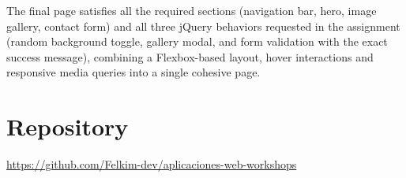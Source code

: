 \documentclass[12pt, a4paper]{article}
\begin{document}
The final page satisfies all the required sections (navigation bar, hero, image
gallery, contact form) and all three jQuery behaviors requested in the assignment
(random background toggle, gallery modal, and form validation with the exact
success message), combining a Flexbox-based layout, hover interactions and
responsive media queries into a single cohesive page.

\section{Repository}

\url{https://github.com/Felkim-dev/aplicaciones-web-workshops}

\end{document}
